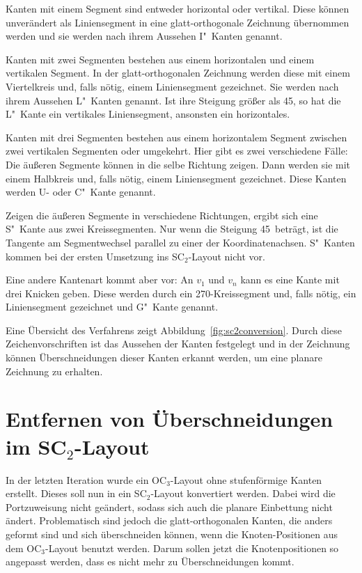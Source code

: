 \documentclass[a4paper]{scrreprt}
\theoremstyle{definition}
\begin{document}
Kanten mit einem Segment sind entweder horizontal oder vertikal. Diese können unverändert als Liniensegment in eine glatt-orthogonale Zeichnung übernommen werden und sie werden nach ihrem Aussehen I"~Kanten genannt.

Kanten mit zwei Segmenten bestehen aus einem horizontalen und einem vertikalen Segment. In der glatt-orthogonalen Zeichnung werden diese mit einem Viertelkreis und, falls nötig, einem Liniensegment gezeichnet. Sie werden nach ihrem Aussehen L"~Kanten genannt. Ist ihre Steigung größer als 45\textdegree, so hat die L"~Kante ein vertikales Liniensegment, ansonsten ein horizontales.

Kanten mit drei Segmenten bestehen aus einem horizontalem Segment zwischen zwei vertikalen Segmenten oder umgekehrt. Hier gibt es zwei verschiedene Fälle: Die äußeren Segmente können in die selbe Richtung zeigen. Dann werden sie mit einem Halbkreis und, falls nötig, einem Liniensegment gezeichnet. Diese Kanten werden U- oder C"~Kante genannt.

Zeigen die äußeren Segmente in verschiedene Richtungen, ergibt sich eine S"~Kante aus zwei Kreissegmenten. Nur wenn die Steigung 45\textdegree\ beträgt, ist die Tangente am Segmentwechsel parallel zu einer der Koordinatenachsen. S"~Kanten kommen bei der ersten Umsetzung ins SC$_2$-Layout nicht vor.

Eine andere Kantenart kommt aber vor: An $v_1$ und $v_n$ kann es eine Kante mit drei Knicken geben. Diese werden durch ein 270\textdegree-Kreissegment und, falls nötig, ein Liniensegment gezeichnet und G"~Kante genannt.

Eine Übersicht des Verfahrens zeigt Abbildung~\ref{fig:sc2conversion}. Durch diese Zeichenvorschriften ist das Aussehen der Kanten festgelegt und in der Zeichnung können Überschneidungen dieser Kanten erkannt werden, um eine planare Zeichnung zu erhalten.

\section{Entfernen von Überschneidungen im SC$_2$-Layout}

In der letzten Iteration wurde ein OC$_3$-Layout ohne stufenförmige Kanten erstellt. Dieses soll nun in ein SC$_2$-Layout konvertiert werden. Dabei wird die Portzuweisung nicht geändert, sodass sich auch die planare Einbettung nicht ändert. Problematisch sind jedoch die glatt-orthogonalen Kanten, die anders geformt sind und sich überschneiden können, wenn die Knoten-Positionen aus dem OC$_3$-Layout benutzt werden. Darum sollen jetzt die Knotenpositionen so angepasst werden, dass es nicht mehr zu Überschneidungen kommt.
\end{document}
